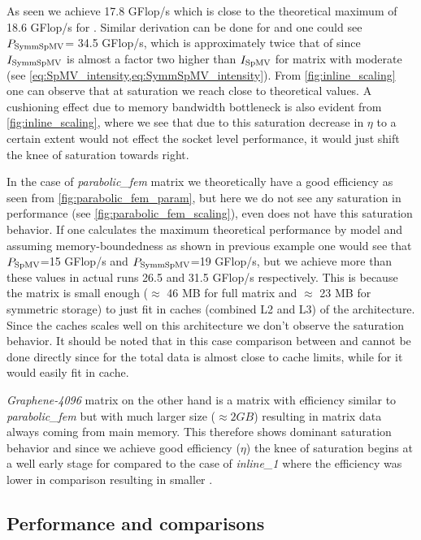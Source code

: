 As seen we achieve 17.8 GFlop/s which is close to the theoretical maximum of 18.6 GFlop/s for \SpMV. Similar derivation can be done for \SymmSpmv and one could see $P_\mathrm{SymmSpMV}$= 34.5 GFlop/s, which is approximately twice that of \SpMV since $I_\mathrm{SymmSpMV}$ is almost a factor two higher than $I_\mathrm{SpMV}$ for matrix with moderate \NNZR (see \cref{eq:SpMV_intensity,eq:SymmSpMV_intensity}). From \cref{fig:inline_scaling} one can observe that at saturation we reach close to theoretical values. A cushioning effect due to memory bandwidth bottleneck is also evident from \cref{fig:inline_scaling}, where we see that due to this saturation decrease in $\eta$ to a certain extent would not effect the socket level performance, it would just shift the knee of saturation towards right.

In the case of \emph{parabolic\_fem} matrix we theoretically have a good efficiency as seen from \cref{fig:parabolic_fem_param}, but here we do not see any saturation in performance (see \cref{fig:parabolic_fem_scaling}), even \SpMV does not have this saturation behavior. If one calculates the maximum  theoretical performance by \roofline model and assuming memory-boundedness as shown in previous example one would see that $P_\mathrm{SpMV}$=15 GFlop/s and $P_\mathrm{SymmSpMV}$=19 GFlop/s, but we achieve more than these values in actual runs 26.5 and 31.5 GFlop/s respectively. This is because the matrix is small enough ($\approx$ 46 MB for full matrix and $\approx$ 23 MB for symmetric storage) to just fit in caches (combined L2 and L3) of the \SKX architecture. Since the caches scales well on this architecture we don't observe the saturation behavior. It should be noted that in this case comparison between \SpMV and \SymmSpmv cannot be done directly since for \SpMV the total data is almost close to cache limits, while for \SymmSpmv it would easily fit in cache.

\emph{Graphene-4096} matrix on the other hand is a matrix with efficiency similar to \emph{parabolic\_fem} but with much larger size ($\approx 2 GB$) resulting in matrix data always coming from main memory. This therefore shows dominant saturation behavior and since we achieve good efficiency ($\eta$) the knee of saturation begins at a well early stage for \SymmSpmv compared to  the case of \emph{inline\_1} where the efficiency was lower in comparison resulting in smaller \threadEff.

\subsection{Performance and comparisons}

